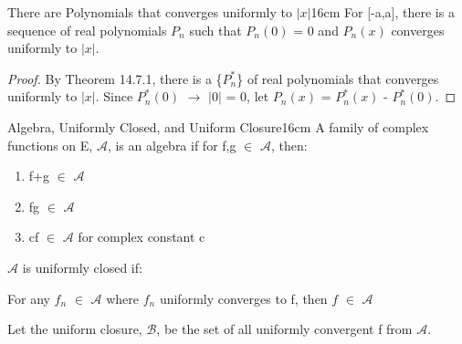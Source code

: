     \vspace{0.5cm}



    \begin{corollary}{There are Polynomials that converges uniformly to $|x|$}{16cm}
        For [-a,a], there is a sequence of real polynomials $P_n$
        such that $P_n(0)$ = 0 and $P_n(x)$ converges uniformly to $|x|$. 
    \end{corollary}

    \begin{proof}
        By {\color{red} Theorem 14.7.1}, there is a \{$P_n^*$\}
        of real polynomials that converges uniformly to $|x|$.
        Since $P_n^*(0)$ $\rightarrow$ $|0|$ = 0, let
        $P_n(x)$ = $P_n^*(x)$ - $P_n^*(0)$.
    \end{proof}

    \vspace{0.5cm}



    \begin{definition}{Algebra, Uniformly Closed, and Uniform Closure}{16cm}
        A family of complex functions on E, $\mathscr{A}$, is
        an {\color{lblue} algebra} if for f,g $\in$ $\mathscr{A}$, then:

        \begin{enumerate}[label=(\alph*), leftmargin=1.5cm, itemsep=0.1cm]
            \item f+g $\in$ $\mathscr{A}$
            
            \item fg $\in$ $\mathscr{A}$
            
            \item cf $\in$ $\mathscr{A}$ for complex constant c 
        \end{enumerate}

        \vspace{0.3cm}

        $\mathscr{A}$ is {\color{lblue} uniformly closed} if:
        
        \hspace{0.5cm}
        For any $f_n$ $\in$ $\mathscr{A}$
        where $f_n$ uniformly converges to f, then $f$ $\in$ $\mathscr{A}$
        
        \vspace{0.3cm}

        Let the {\color{lblue} uniform closure}, $\mathscr{B}$, be the set of all
        uniformly convergent f from $\mathscr{A}$.
    \end{definition}


